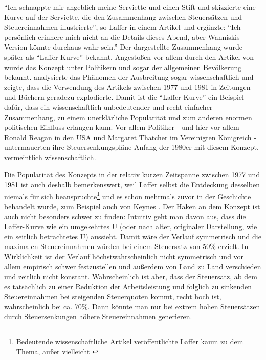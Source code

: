"`Ich schnappte mir angeblich meine Serviette und einen Stift und skizzierte eine Kurve auf der Serviette, die den Zusammenhang zwischen Steuersätzen und Steuereinnahmen illustrierte"', so Laffer in einem Artikel \parencite[S. 1]{Laffer2004} und ergänzte: "`Ich persönlich erinnere mich nicht an die Details dieses Abend, aber Wanniskis Version könnte durchaus wahr sein."'
Der dargestellte Zusammenhang wurde später als "`Laffer Kurve"' bekannt. Angestoßen vor allem durch den Artikel von \textcite{Wanniski1978} wurde das Konzept unter Politikern und sogar der allgemeinen Bevölkerung bekannt. \textcite[S. 979ff]{Shiller2017} analysierte das Phänomen der Ausbreitung sogar wissenschaftlich und zeigte, dass die Verwendung des Artikels zwischen 1977 und 1981 in Zeitungen und Büchern geradezu explodierte. 
Damit ist die "`Laffer-Kurve"' ein Beispiel dafür, dass ein wissenschaftlich unbedeutender und recht einfacher Zusammenhang, zu einem unerklärliche Popularität und zum anderen enormen politischen Einfluss erlangen kann. Vor allem Politiker - und hier vor allem Ronald Reagan in den USA und Margaret Thatcher im Vereinigten Königreich - untermauerten ihre Steuersenkungspläne Anfang der 1980er  mit diesem Konzept, vermeintlich wissenschaftlich.

Die Popularität des Konzepts in der relativ kurzen Zeitspanne zwischen 1977 und 1981 \parencite[S. 980]{Shiller2017} ist auch deshalb bemerkenswert, weil Laffer selbst die Entdeckung desselben niemals für sich beanspruchte\footnote{Bedeutende wissenschaftliche Artikel veröffentlichte Laffer kaum zu dem Thema, außer vielleicht \textcite{Laffer1981}} und es schon mehrmals zuvor in der Geschichte behandelt wurde, zum Beispiel auch von Keynes \parencite[S. 2]{Laffer2004}. Der Haken an dem Konzept ist auch nicht besonders schwer zu finden: Intuitiv geht man davon aus, dass die Laffer-Kurve wie ein umgekehrtes U (oder nach alter, originaler Darstellung, wie ein seitlich betrachtetes U) aussieht. Damit wäre der Verlauf symmetrisch und die maximalen Steuereinnahmen würden bei einem Steuersatz von 50\% erzielt. In Wirklichkeit ist der Verlauf höchstwahrscheinlich nicht symmetrisch und vor allem empirisch schwer festzustellen und außerdem von Land zu Land verschieden und zeitlich nicht konstant. Wahrscheinlich ist aber, dass der Steuersatz, ab dem es tatsächlich zu einer Reduktion der Arbeitsleistung und folglich zu sinkenden Steuereinnahmen bei steigenden Steuerquoten kommt, recht hoch ist, wahrscheinlich bei ca. 70\%. Dann könnte man nur bei extrem hohen Steuersätzen durch Steuersenkungen höhere Steuereinnahmen generieren.

